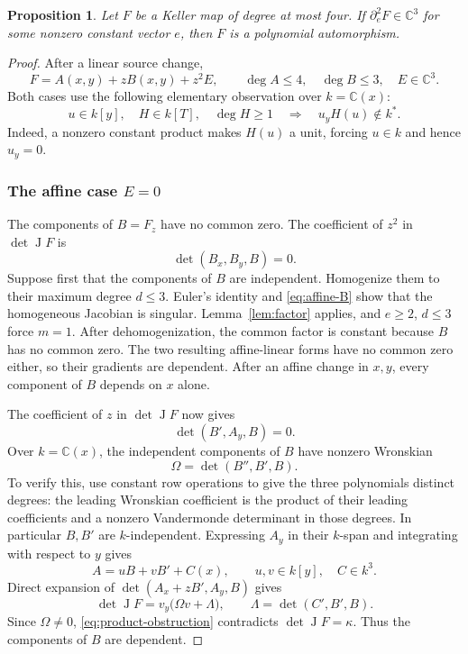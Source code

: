 \documentclass[11pt,reqno]{amsart}
\numberwithin{equation}{section}
\theoremstyle{plain}
\newtheorem{proposition}[theorem]{Proposition}
\theoremstyle{definition}
\theoremstyle{remark}
\newcommand{\C}{\mathbb C}
\newcommand{\J}{\operatorname J}
\begin{document}
\begin{proposition}\label{prop:direction}
Let $F$ be a Keller map of degree at most four. If $\partial_e^2F\in\C^3$ for some nonzero constant vector $e$, then $F$ is a polynomial automorphism.
\end{proposition}
\begin{proof}
After a linear source change,
\begin{equation}\label{eq:direction-form}
F=A(x,y)+zB(x,y)+z^2E,\qquad
\deg A\le4,\quad\deg B\le3,\quad E\in\C^3.
\end{equation}
Both cases use the following elementary observation over $k=\C(x)$:
\begin{equation}\label{eq:product-obstruction}
u\in k[y],\quad H\in k[T],\quad\deg H\ge1
\quad\Longrightarrow\quad u_yH(u)\notin k^*.
\end{equation}
Indeed, a nonzero constant product makes $H(u)$ a unit, forcing $u\in k$ and hence $u_y=0$.

\subsubsection*{The affine case \texorpdfstring{$E=0$}{E=0}}
The components of $B=F_z$ have no common zero. The coefficient of $z^2$ in $\det\J F$ is
\begin{equation}\label{eq:affine-B}
\det(B_x,B_y,B)=0.
\end{equation}
Suppose first that the components of $B$ are independent. Homogenize them to their maximum degree $d\le3$. Euler's identity and \eqref{eq:affine-B} show that the homogeneous Jacobian is singular. Lemma~\ref{lem:factor} applies, and $e\ge2$, $d\le3$ force $m=1$. After dehomogenization, the common factor is constant because $B$ has no common zero. The two resulting affine-linear forms have no common zero either, so their gradients are dependent. After an affine change in $x,y$, every component of $B$ depends on $x$ alone.

The coefficient of $z$ in $\det\J F$ now gives
\[
\det(B',A_y,B)=0.
\]
Over $k=\C(x)$, the independent components of $B$ have nonzero Wronskian
\[
\Omega=\det(B'',B',B).
\]
To verify this, use constant row operations to give the three polynomials distinct degrees: the leading Wronskian coefficient is the product of their leading coefficients and a nonzero Vandermonde determinant in those degrees. In particular $B,B'$ are $k$-independent. Expressing $A_y$ in their $k$-span and integrating with respect to $y$ gives
\[
A=uB+vB'+C(x),\qquad u,v\in k[y],\quad C\in k^3.
\]
Direct expansion of $\det(A_x+zB',A_y,B)$ gives
\begin{equation}\label{eq:affine-wronskian}
\det\J F=v_y\bigl(\Omega v+\Lambda\bigr),
\qquad\Lambda=\det(C',B',B).
\end{equation}
Since $\Omega\ne0$, \eqref{eq:product-obstruction} contradicts $\det\J F=\kappa$. Thus the components of $B$ are dependent.


\end{proof}
\end{document}
